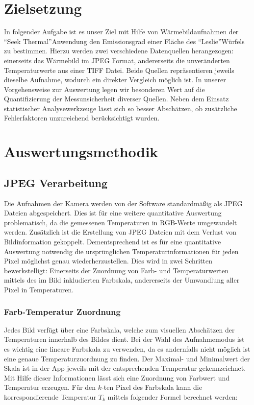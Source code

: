 \documentclass{article}
\begin{document}
\section{Zielsetzung}
In folgender Aufgabe ist es unser Ziel mit Hilfe von Wärmebildaufnahmen der \textquotedblleft Seek Thermal\textquotedblright Anwendung den Emissionsgrad einer Fläche des \textquotedblleft Leslie\textquotedblright Würfels zu bestimmen.
Hierzu werden zwei verschiedene Datenquellen herangezogen: einerseits das Wärmebild im JPEG Format, andererseits die unveränderten Temperaturwerte aus einer TIFF Datei.
Beide Quellen repräsentieren jeweils dieselbe Aufnahme, wodurch ein direkter Vergleich möglich ist.
In unserer Vorgehensweise zur Auswertung legen wir besonderen Wert auf die Quantifizierung der Messunsicherheit diverser Quellen.
Neben dem Einsatz statistischer Analysewerkzeuge lässt sich so besser Abschätzen, ob zusätzliche Fehlerfaktoren unzureichend berücksichtigt wurden.

\section{Auswertungsmethodik}
\subsection{JPEG Verarbeitung}
Die Aufnahmen der Kamera werden von der Software standardmäßig als JPEG Dateien abgespeichert.
Dies ist für eine weitere quantitative Auswertung problematisch, da die gemessenen Temperaturen in RGB-Werte umgewandelt werden.
Zusätzlich ist die Erstellung von JPEG Dateien mit dem Verlust von Bildinformation gekoppelt. 
Dementsprechend ist es für eine quantitative Auswertung notwendig die ursprünglichen Temperaturinformationen für jeden Pixel möglichst genau wiederherzustellen.
Dies wird in zwei Schritten bewerkstelligt:
Einerseits der Zuordnung von Farb- und Temperaturwerten mittels des im Bild inkludierten Farbskala, andererseits der Umwandlung aller Pixel in Temperaturen.

\subsubsection{Farb-Temperatur Zuordnung}

Jedes Bild verfügt über eine Farbskala, welche zum visuellen Abschätzen der Temperaturen innerhalb des Bildes dient.
Bei der Wahl des Aufnahmemodus ist es wichtig eine lineare Farbskala zu verwenden, da es andernfalls nicht möglich ist eine genaue Temperaturzuordnung zu finden.
Der Maximal- und Minimalwert der Skala ist in der App jeweils mit der entsprechenden Temperatur gekennzeichnet.
Mit Hilfe dieser Informationen lässt sich eine Zuordnung von Farbwert und Temperatur erzeugen.
Für den $k$-ten Pixel des Farbskala kann die korrespondierende Temperatur $T_{k}$ mittels folgender Formel berechnet werden:
\end{document}
